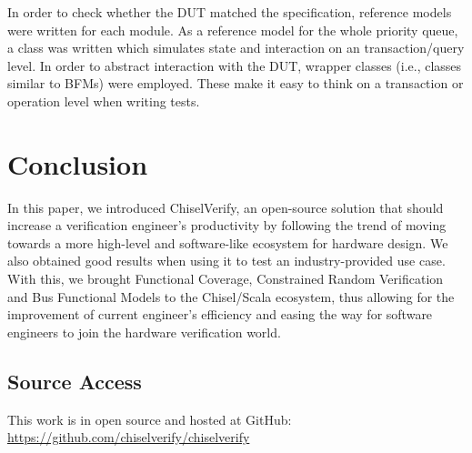 \documentclass[conference]{IEEEtran}
\begin{document}
In order to check whether the DUT matched the specification, reference models were written for each module. 
As a reference model for the whole priority queue, a class 
was written which simulates state and interaction on an transaction/query level. In order to abstract interaction with the DUT,
wrapper classes (i.e., classes similar to BFMs) were employed. These make it easy to think on a transaction or 
operation level when writing tests.

\section{Conclusion}
In this paper, we introduced ChiselVerify, an open-source solution that should increase a verification engineer's productivity by following the trend of moving towards a more high-level and software-like ecosystem for hardware design. 
We also obtained good results when using it to test an industry-provided use case.
With this, we brought Functional Coverage, Constrained Random Verification and Bus Functional Models to the Chisel/Scala ecosystem, thus allowing for the improvement of current engineer's efficiency and easing the way for software engineers to join the hardware verification world.

\subsection*{Source Access}

This work is in open source and hosted at GitHub: \url{https://github.com/chiselverify/chiselverify}




\end{document}
